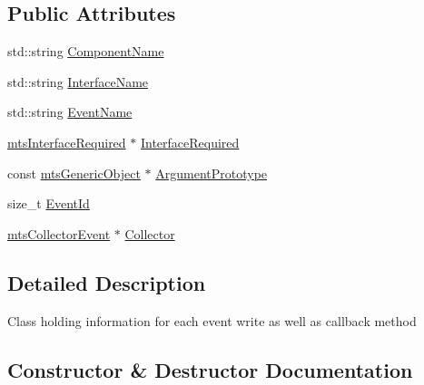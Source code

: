 \subsection*{Public Attributes}
\begin{DoxyCompactItemize}
\item 
std\+::string \hyperlink{classmts_collector_event_1_1_collector_event_write_afd3231863670f93fcbf5a514eabd320f}{Component\+Name}
\item 
std\+::string \hyperlink{classmts_collector_event_1_1_collector_event_write_a7f50054b5709dc9d12b073b45193c0c1}{Interface\+Name}
\item 
std\+::string \hyperlink{classmts_collector_event_1_1_collector_event_write_aa32519e39892386c15043154c5872ea5}{Event\+Name}
\item 
\hyperlink{classmts_interface_required}{mts\+Interface\+Required} $\ast$ \hyperlink{classmts_collector_event_1_1_collector_event_write_a4b474bb7e7316260c530ba3b496c78c3}{Interface\+Required}
\item 
const \hyperlink{classmts_generic_object}{mts\+Generic\+Object} $\ast$ \hyperlink{classmts_collector_event_1_1_collector_event_write_a1c7d71e7755790e25b4cc79b300ed89e}{Argument\+Prototype}
\item 
size\+\_\+t \hyperlink{classmts_collector_event_1_1_collector_event_write_a82781660173facd33329511a335a28e0}{Event\+Id}
\item 
\hyperlink{classmts_collector_event}{mts\+Collector\+Event} $\ast$ \hyperlink{classmts_collector_event_1_1_collector_event_write_aff7c6b5a034650d07c8748cef20fc06d}{Collector}
\end{DoxyCompactItemize}


\subsection{Detailed Description}
Class holding information for each event write as well as callback method 

\subsection{Constructor \& Destructor Documentation}
\hypertarget{classmts_collector_event_1_1_collector_event_write_abe8f342fbb5e55e9a34fc54859e8fc15}{}
